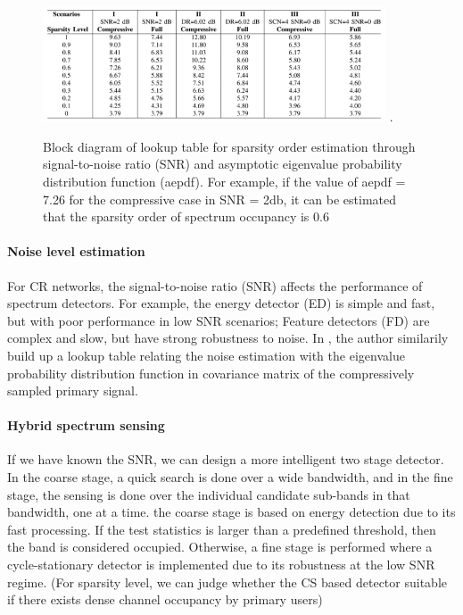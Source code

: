 \begin{figure}[!t]
\centering
\includegraphics[width=4.0in]{figs/csp-soe.png}
\DeclareGraphicsExtensions.
\caption{Block diagram of lookup table for sparsity order estimation through signal-to-noise ratio (SNR) and asymptotic eigenvalue probability distribution function (aepdf). For example, if the value of aepdf = 7.26 for the compressive case in SNR = 2db, it can be estimated that the sparsity order of spectrum occupancy is 0.6}\label{csp-soe}
\end{figure}

\paragraph{Noise level estimation}
For CR networks, the signal-to-noise ratio (SNR) affects the performance of spectrum detectors. For example, the energy detector (ED) is simple and fast, but with poor performance in low SNR scenarios; Feature detectors (FD) are complex and slow, but have strong robustness to noise. In \cite{sharma2014compressive_snr}, the author similarily build up a lookup table relating the noise estimation with the eigenvalue probability distribution function in covariance matrix of the compressively sampled primary signal. 

\paragraph{Hybrid spectrum sensing} If we have known the SNR, we can design a more intelligent two stage detector. In the coarse stage, a quick search is done over a wide bandwidth, and in the fine stage, the sensing is done over the individual candidate sub-bands in that bandwidth, one at a time. the coarse stage is based on energy detection due to its fast processing. If the test statistics is larger than a predefined threshold, then the band is considered occupied. Otherwise, a fine stage is performed where a cycle-stationary detector is implemented due to its robustness at the low SNR regime. (For sparsity level, we can judge whether the CS based detector suitable if there exists dense channel occupancy by primary users)

